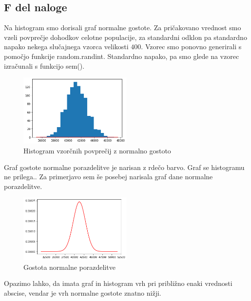 \documentclass{article}
\begin{document}
\subsection{F del naloge}
Na histogram smo dorisali graf normalne gostote. Za pričakovano vrednost smo vzeli povprečje dohodkov
celotne populacije, za standardni odklon pa standardno napako nekega slučajnega vzorca velikosti $400$.
Vzorec smo ponovno generirali s pomočjo funkcije random.randint. Standardno napako, pa smo glede na vzorec 
izračunali s funkcijo sem(). 

\begin{figure}[H]
    \begin{center}
        \includegraphics*[width=0.5\textwidth]{figure1F.png}
        \caption{Histogram vzorčnih povprečij z normalno gostoto}
        \label{hist_vzor_normalna}
    \end{center}
\end{figure}

Graf gostote normalne porazdelitve je narisan z rdečo barvo. Graf se histogramu ne prilega..
Za primerjavo sem še posebej narisala graf dane normalne porazdelitve. 

\begin{figure}[H]
    \begin{center}
        \includegraphics*[width=0.5\textwidth]{figure1F(1).png}
        \caption{Gostota normalne porazdelitve}
        \label{normalna}
    \end{center}
\end{figure}
Opazimo lahko, da imata graf in histogram vrh pri približno enaki vrednosti abscise, vendar je vrh normalne 
gostote znatno nižji.
\end{document}
